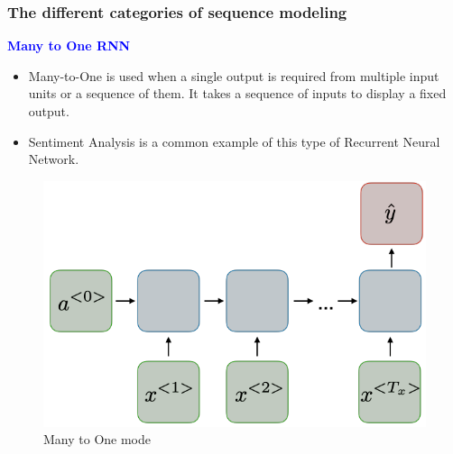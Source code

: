 \documentclass[11pt,]{beamer}
\begin{document}
\begin{frame}
	\frametitle{The different categories of sequence modeling}
	\large{\textcolor{blue}{\textbf{Many to One RNN}}}
	\begin{itemize}
		\item Many-to-One is used when a single output is required from multiple input units or a sequence of them. It takes a sequence of inputs to display a fixed output.
		\item Sentiment Analysis is a common example of this type of Recurrent Neural Network.
	\end{itemize}
	\begin{figure}[h]
		\centering
		\includegraphics[scale=0.3]{Images/rnn-many-to-one-ltr.png}
		\caption{Many to One mode}
	\end{figure}
\end{frame}
\end{document}
